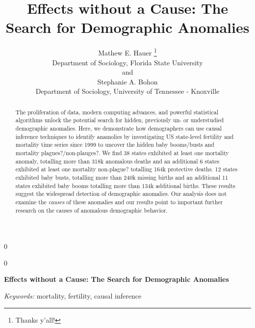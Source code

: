\documentclass[12pt]{article}
\newcommand{\blind}{0}
\begin{document}
\def\spacingset#1{\renewcommand{\baselinestretch}%
{#1}\small\normalsize} \spacingset{1}



\blind
{
  \title{\bf Effects without a Cause: The Search for Demographic Anomalies}

  \author{
        Mathew E. Hauer \thanks{Thanks y'all!} \\
    Department of Sociology, Florida State University\\
     and \\     Stephanie A. Bohon \\
    Department of Sociology, University of Tennessee - Knoxville\\
      }
  \maketitle
} \fi

\blind
{
  \bigskip
  \bigskip
  \bigskip
  \begin{center}
    {\LARGE\bf Effects without a Cause: The Search for Demographic Anomalies}
  \end{center}
  \medskip
} \fi

\bigskip
\begin{abstract}
The proliferation of data, modern computing advances, and powerful
statistical algorithms unlock the potential search for hidden,
previously un- or understudied demographic anomalies. Here, we
demonstrate how demographers can use causal inference techniques to
identify anamolies by investigating US state-level fertility and
mortality time series since 1999 to uncover the hidden baby booms/busts
and mortality plagues?/non-plauges?. We find 38 states exhibited at
least one mortality anomaly, totalling more than 318k anomalous deaths
and an additional 6 states exhibited at least one mortality non-plague?
totalling 164k protective deaths. 12 states exhibited baby busts,
totalling more than 240k missing births and an additional 11 states
exhibited baby booms totalling more than 134k additional births. These
results suggest the widespread detection of demographic anomalies. Our
analysis does not examine the \emph{causes} of these anomalies and our
results point to important further research on the causes of anomalous
demographic behavior.\\
\end{abstract}

\noindent%
{\it Keywords:} mortality, fertility, causal inference
\vfill
\end{document}
